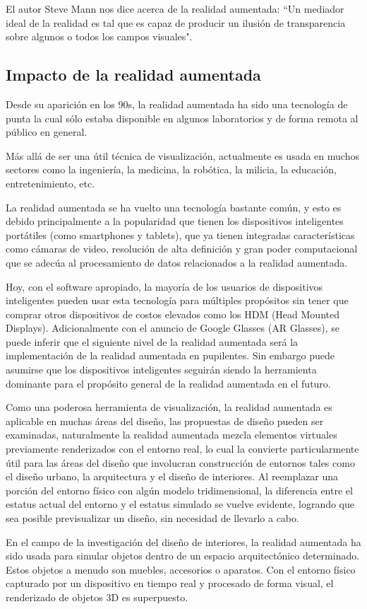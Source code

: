 El autor Steve Mann nos dice acerca de la realidad aumentada: ``Un mediador ideal de la realidad es tal que es capaz de producir un ilusión de transparencia sobre algunos o todos los campos visuales"\cite{B22}. \par
\subsection{Impacto de la realidad aumentada}
Desde su aparición en los 90s, la realidad aumentada ha sido una tecnología de punta la cual sólo estaba disponible en algunos laboratorios y de forma remota al público en general. \par
Más allá de ser una útil técnica de visualización, actualmente es usada en muchos sectores como la ingeniería, la medicina, la robótica, la milicia, la educación, entretenimiento, etc.\par
La realidad aumentada se ha vuelto una tecnología bastante común, y esto es debido principalmente a la popularidad que tienen los dispositivos inteligentes portátiles (como smartphones y tablets), que ya tienen integradas características como cámaras de video, resolución de alta definición y gran poder computacional que se adecúa al procesamiento de datos relacionados a la realidad aumentada.\par
Hoy, con el software apropiado, la mayoría de los usuarios de dispositivos inteligentes pueden usar esta tecnología para múltiples propósitos sin tener que comprar otros dispositivos de costos elevados como los HDM (Head Mounted Displays). Adicionalmente con el anuncio de Google Glasses (AR Glasses), se puede inferir que el siguiente nivel de la realidad aumentada será la implementación de la realidad aumentada en pupilentes. Sin embargo puede asumirse que los dispositivos inteligentes seguirán siendo la herramienta dominante para el propósito general de la realidad aumentada en el futuro.\par
Como una poderosa herramienta de visualización, la realidad aumentada es aplicable en muchas áreas del diseño, las propuestas de diseño pueden ser examinadas, naturalmente la realidad aumentada mezcla elementos virtuales previamente renderizados con el entorno real, lo cual la convierte particularmente útil para las áreas del diseño que involucran construcción de entornos tales como el diseño urbano, la arquitectura y el diseño de interiores. Al reemplazar una porción del entorno físico con algún modelo tridimensional, la diferencia entre el estatus actual del entorno y el estatus simulado se vuelve evidente, logrando que sea posible previsualizar un diseño, sin necesidad de llevarlo a cabo.\par
En el campo de la investigación del diseño de interiores, la realidad aumentada ha sido usada para simular objetos dentro de un espacio arquitectónico determinado. Estos objetos a menudo son muebles, accesorios o aparatos. Con el entorno físico capturado por un dispositivo en tiempo real y procesado de forma visual, el renderizado de objetos 3D es superpuesto.

